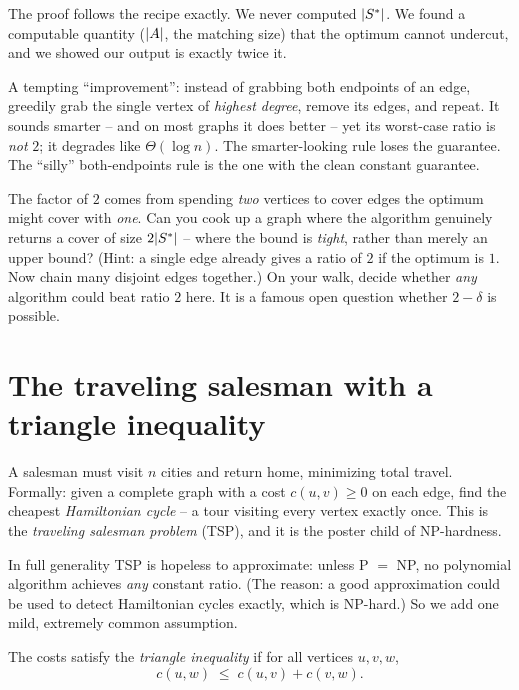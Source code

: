 The proof follows the recipe exactly. We never computed
$\lvert S^{*}\rvert$. We found a computable quantity ($\lvert A\rvert$, the matching size)
that the optimum cannot undercut, and we showed our output is exactly twice it.

\begin{trapbox}
A tempting ``improvement'': instead of grabbing both endpoints of an edge,
greedily grab the single vertex of \emph{highest degree}, remove its edges,
and repeat. It sounds smarter -- and on most graphs it does better -- yet its
worst-case ratio is \emph{not} $2$; it degrades like $\Theta(\log n)$.
The smarter-looking rule loses the guarantee. The ``silly'' both-endpoints rule is
the one with the clean constant guarantee.
\end{trapbox}

\begin{walkbox}
The factor of $2$ comes from spending \emph{two} vertices to cover edges the
optimum might cover with \emph{one}. Can you cook up a graph where the
algorithm genuinely returns a cover of size $2\lvert S^{*}\rvert$ -- where the bound
is \emph{tight}, rather than merely an upper bound? (Hint: a single edge already gives a
ratio of $2$ if the optimum is $1$. Now chain many disjoint edges together.)
On your walk, decide whether \emph{any} algorithm could beat ratio $2$ here.
It is a famous open question whether $2-\delta$ is possible.
\end{walkbox}

\section{The traveling salesman with a triangle inequality}

A salesman must visit $n$ cities and return home, minimizing total travel.
Formally: given a complete graph with a cost $c(u,v) \ge 0$ on each edge,
find the cheapest \emph{Hamiltonian cycle} -- a tour visiting every vertex
exactly once. This is the \emph{traveling salesman problem} (TSP), and it is
the poster child of NP-hardness.

In full generality TSP is hopeless to approximate: unless P $=$ NP, no
polynomial algorithm achieves \emph{any} constant ratio. (The reason: a good
approximation could be used to detect Hamiltonian cycles exactly, which is
NP-hard.) So we add one mild, extremely common assumption.

\begin{definition}
\label{ch34:tri}
The costs satisfy the \emph{triangle inequality} if for all vertices
$u,v,w$,
\[
c(u,w) \;\le\; c(u,v) + c(v,w).
\]
\end{definition}

